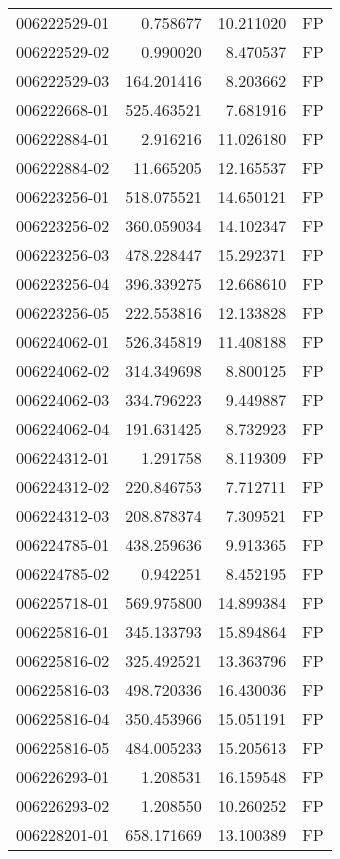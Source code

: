 \begin{tabular}{lrrl}
006222529-01 &    0.758677 &    10.211020 &   FP \\
006222529-02 &    0.990020 &     8.470537 &   FP \\
006222529-03 &  164.201416 &     8.203662 &   FP \\
006222668-01 &  525.463521 &     7.681916 &   FP \\
006222884-01 &    2.916216 &    11.026180 &   FP \\
006222884-02 &   11.665205 &    12.165537 &   FP \\
006223256-01 &  518.075521 &    14.650121 &   FP \\
006223256-02 &  360.059034 &    14.102347 &   FP \\
006223256-03 &  478.228447 &    15.292371 &   FP \\
006223256-04 &  396.339275 &    12.668610 &   FP \\
006223256-05 &  222.553816 &    12.133828 &   FP \\
006224062-01 &  526.345819 &    11.408188 &   FP \\
006224062-02 &  314.349698 &     8.800125 &   FP \\
006224062-03 &  334.796223 &     9.449887 &   FP \\
006224062-04 &  191.631425 &     8.732923 &   FP \\
006224312-01 &    1.291758 &     8.119309 &   FP \\
006224312-02 &  220.846753 &     7.712711 &   FP \\
006224312-03 &  208.878374 &     7.309521 &   FP \\
006224785-01 &  438.259636 &     9.913365 &   FP \\
006224785-02 &    0.942251 &     8.452195 &   FP \\
006225718-01 &  569.975800 &    14.899384 &   FP \\
006225816-01 &  345.133793 &    15.894864 &   FP \\
006225816-02 &  325.492521 &    13.363796 &   FP \\
006225816-03 &  498.720336 &    16.430036 &   FP \\
006225816-04 &  350.453966 &    15.051191 &   FP \\
006225816-05 &  484.005233 &    15.205613 &   FP \\
006226293-01 &    1.208531 &    16.159548 &   FP \\
006226293-02 &    1.208550 &    10.260252 &   FP \\
006228201-01 &  658.171669 &    13.100389 &   FP \\

\end{tabular}
